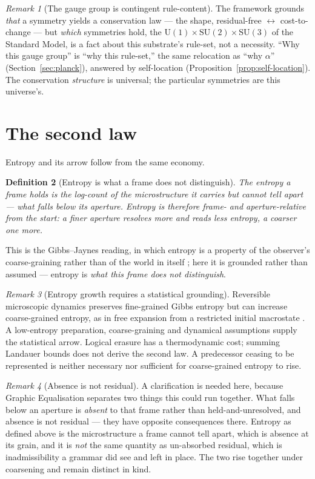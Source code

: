 \documentclass[11pt,a4paper]{article}
\newtheorem{definition}{Definition}[section]
\theoremstyle{remark}\newtheorem{remark}[definition]{Remark}
\begin{document}
\begin{remark}[The gauge group is contingent rule-content]\label{rem:gauge-contingent}
The framework grounds \emph{that} a symmetry yields a conservation law --- the
shape, residual-free $\leftrightarrow$ cost-to-change --- but \emph{which}
symmetries hold, the $\mathrm{U}(1)\times\mathrm{SU}(2)\times\mathrm{SU}(3)$ of
the Standard Model, is a fact about this substrate's rule-set, not a necessity.
``Why this gauge group'' is ``why this rule-set,'' the same relocation as ``why
$\alpha$'' (Section~\ref{sec:planck}), answered by self-location
(Proposition~\ref{prop:self-location}). The conservation \emph{structure} is
universal; the particular symmetries are this universe's.
\end{remark}

\section{The second law}\label{sec:second-law}
Entropy and its arrow follow from the same economy.

\begin{definition}[Entropy is what a frame does not distinguish]\label{def:entropy}
The entropy a frame holds is the log-count of the microstructure it carries but
cannot tell apart --- what falls below its aperture. Entropy is therefore
frame- and aperture-relative from the start: a finer aperture resolves more and
reads less entropy, a coarser one more.
\end{definition}
This is the Gibbs--Jaynes reading, in which entropy is a property of the
observer's coarse-graining rather than of the world in itself \citep{jaynes1957};
here it is grounded rather than assumed --- entropy is \emph{what this frame does
not distinguish}.

\begin{remark}[Entropy growth requires a statistical grounding]\label{prop:second-law}
Reversible microscopic dynamics preserves fine-grained Gibbs entropy but
can increase coarse-grained entropy, as in free expansion from a restricted
initial macrostate \citep{jaynes1957}. A low-entropy preparation,
coarse-graining and dynamical assumptions supply the statistical arrow.
Logical erasure has a thermodynamic cost; summing Landauer bounds does not
derive the second law. A predecessor ceasing to be represented is neither
necessary nor sufficient for coarse-grained entropy to rise.
\end{remark}

\begin{remark}[Absence is not residual]\label{rem:absence-not-residual}
A clarification is needed here, because Graphic Equalisation separates two things this
could run together. What falls below an aperture is \emph{absent} to that frame rather than
held-and-unresolved, and absence is not residual --- they have opposite consequences there. Entropy as
defined above is the microstructure a frame cannot tell apart, which is absence at its grain, and it is
\emph{not} the same quantity as un-absorbed residual, which is inadmissibility a grammar did see and
left in place. The two rise together under coarsening and remain distinct in kind.
\end{remark}
\end{document}
